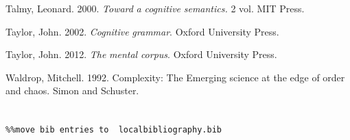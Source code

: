 \begin{stylereferences}
Talmy, Leonard. 2000. \textit{Toward} \textit{a} \textit{cognitive} \textit{semantics.} 2 vol. MIT Press.
\end{stylereferences}

\begin{stylereferences}
Taylor, John. 2002. \textit{Cognitive} \textit{grammar}. Oxford University Press.
\end{stylereferences}

\begin{stylereferences}
Taylor, John. 2012. \textit{The} \textit{mental} \textit{corpus}. Oxford University Press.
\end{stylereferences}

\begin{stylereferences}
Waldrop, Mitchell. 1992. Complexity: The Emerging science at the edge of order and chaos. Simon and Schuster. 
\end{stylereferences}
\chapter{}

\begin{verbatim}%%move bib entries to  localbibliography.bib
\end{verbatim} 